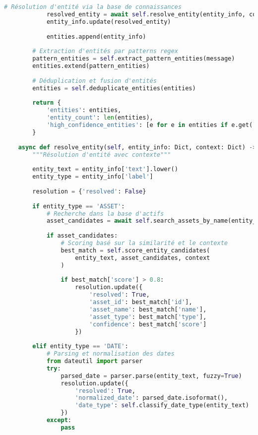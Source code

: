 \documentclass[12pt,a4paper]{report}
\begin{document}
\begin{lstlisting}[language=Python, caption=Pipeline NLP avancé pour le chatbot]
            # Résolution d'entité via la base de connaissances
            resolved_entity = await self.resolve_entity(entity_info, context)
            entity_info.update(resolved_entity)
            
            entities.append(entity_info)
        
        # Extraction d'entités par patterns regex
        pattern_entities = self.extract_pattern_entities(message)
        entities.extend(pattern_entities)
        
        # Déduplication et fusion d'entités
        entities = self.deduplicate_entities(entities)
        
        return {
            'entities': entities,
            'entity_count': len(entities),
            'high_confidence_entities': [e for e in entities if e.get('confidence', 0) > 0.8]
        }
    
    async def resolve_entity(self, entity_info: Dict, context: Dict) -> Dict:
        """Résolution d'entité avec contexte"""
        
        entity_text = entity_info['text'].lower()
        entity_type = entity_info['label']
        
        resolution = {'resolved': False}
        
        if entity_type == 'ASSET':
            # Recherche dans la base d'actifs
            asset_candidates = await self.search_assets_by_name(entity_text)
            
            if asset_candidates:
                # Scoring basé sur la similarité et le contexte
                best_match = self.score_entity_candidates(
                    entity_text, asset_candidates, context
                )
                
                if best_match['score'] > 0.8:
                    resolution.update({
                        'resolved': True,
                        'asset_id': best_match['id'],
                        'asset_name': best_match['name'],
                        'asset_type': best_match['type'],
                        'confidence': best_match['score']
                    })
        
        elif entity_type == 'DATE':
            # Parsing et normalisation des dates
            from dateutil import parser
            try:
                parsed_date = parser.parse(entity_text, fuzzy=True)
                resolution.update({
                    'resolved': True,
                    'normalized_date': parsed_date.isoformat(),
                    'date_type': self.classify_date_type(entity_text)
                })
            except:
                pass
        

\end{lstlisting}
\end{document}
